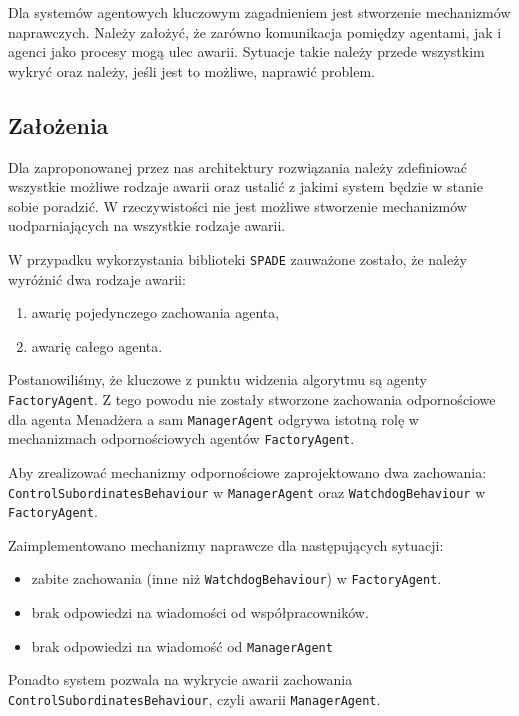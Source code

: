 
Dla systemów agentowych kluczowym zagadnieniem jest stworzenie mechanizmów naprawczych. Należy założyć, że zarówno komunikacja pomiędzy agentami, jak i agenci jako procesy mogą ulec awarii. Sytuacje takie należy przede wszystkim wykryć oraz należy, jeśli jest to możliwe, naprawić problem. 

\subsection{Założenia}

Dla zaproponowanej przez nas architektury rozwiązania należy zdefiniować wszystkie możliwe rodzaje awarii oraz ustalić z jakimi system będzie w stanie sobie poradzić. W rzeczywistości nie jest możliwe stworzenie mechanizmów uodparniających na wszystkie rodzaje awarii. 

W przypadku wykorzystania biblioteki \texttt{SPADE} zauważone zostało, że należy wyróżnić dwa rodzaje awarii:
\begin{enumerate}
	\item awarię pojedynczego zachowania agenta,
	\item awarię całego agenta.
\end{enumerate}

Postanowiliśmy, że kluczowe z punktu widzenia algorytmu są agenty \texttt{FactoryAgent}. Z tego powodu nie zostały stworzone zachowania odpornościowe dla agenta Menadżera a sam \texttt{ManagerAgent} odgrywa istotną rolę w mechanizmach odpornościowych agentów \texttt{FactoryAgent}. 

Aby zrealizować mechanizmy odpornościowe zaprojektowano dwa zachowania: \texttt{ControlSubordinatesBehaviour} w \texttt{ManagerAgent} oraz \texttt{WatchdogBehaviour} w \texttt{FactoryAgent}.
 
Zaimplementowano mechanizmy naprawcze dla następujących sytuacji:
\begin{itemize}
	\item zabite zachowania (inne niż \texttt{WatchdogBehaviour}) w \texttt{FactoryAgent}.
	\item brak odpowiedzi na wiadomości od współpracowników.
	\item brak odpowiedzi na wiadomość od \texttt{ManagerAgent}
\end{itemize}

Ponadto system pozwala na wykrycie awarii zachowania \texttt{ControlSubordinatesBehaviour}, czyli awarii \texttt{ManagerAgent}.

